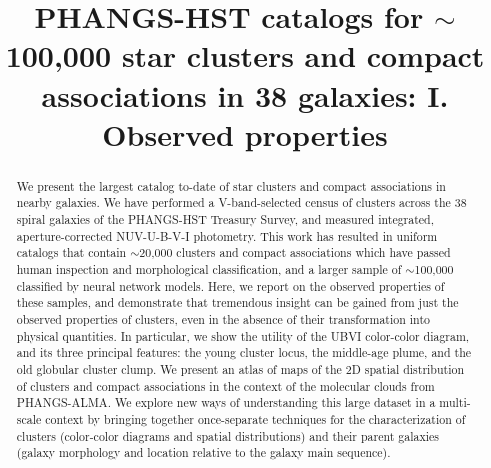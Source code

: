 \documentclass[linenumbers]{aastex63}
\begin{document}
\title{PHANGS-HST catalogs for $\sim$100,000 star clusters and compact associations in 38 galaxies: I. Observed properties}




\begin{abstract}
We present the largest catalog to-date of star clusters and compact associations in nearby galaxies.  We have performed a V-band-selected census of clusters across the 38 spiral galaxies of the PHANGS-HST Treasury Survey, and measured integrated, aperture-corrected NUV-U-B-V-I photometry.
This work has resulted in uniform catalogs that contain $\sim$20,000 clusters and compact associations which have passed human inspection and morphological classification, and a larger sample of $\sim$100,000 classified by neural network models. 
Here, we report on the observed properties of these samples, and demonstrate that tremendous insight can be gained from just the observed properties of clusters, even in the absence of their transformation into physical quantities. 
In particular, we show the utility of the UBVI color-color diagram, and its three principal features: the young cluster locus, the middle-age plume, and the old globular cluster clump.  
We present an atlas of maps of the 2D spatial distribution of clusters and compact associations in the context of the molecular clouds from PHANGS-ALMA.  We explore new ways of understanding this large dataset in a multi-scale context by bringing together once-separate techniques for the characterization of clusters (color-color diagrams and spatial distributions) and their parent galaxies (galaxy morphology and location relative to the galaxy main sequence). 

\end{abstract}
\end{document}
